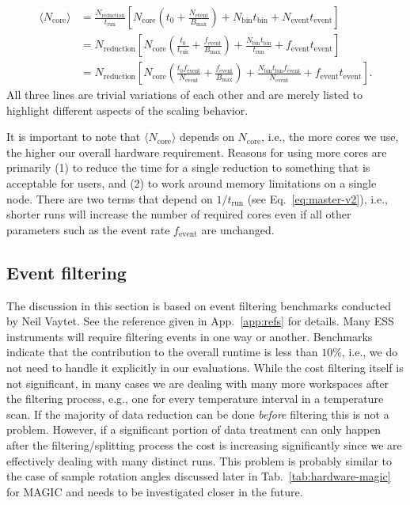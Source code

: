 \documentclass[a4paper,english,numbers=noenddot,bibliography=totoc,chapterprefix=on,DIV=12]{scrartcl}
\newcommand{\Trun}{t_{\text{run}}}
\newcommand{\Tbin}{t_{\text{bin}}}
\newcommand{\Tevent}{t_{\text{event}}}
\newcommand{\Nbin}{N_{\text{bin}}}
\newcommand{\Ncore}{N_{\text{core}}}
\newcommand{\Ncoremean}{\langle N_{\text{core}}\rangle}
\newcommand{\Nevent}{N_{\text{event}}}
\newcommand{\Nreduction}{N_{\text{reduction}}}
\newcommand{\Bmax}{B_{\text{max}}}
\newcommand{\Fevent}{f_{\text{event}}}
\newcommand{\magic}{MAGIC\xspace}
\begin{document}
\begin{align}
  \Ncoremean &= \frac{\Nreduction}{\Trun}\left[\Ncore \left(t_0 + \frac{\Nevent}{\Bmax}\right) + \Nbin\Tbin + \Nevent\Tevent\right]\\
  \label{eq:master-v2}
   &= \Nreduction\left[\Ncore \left(\frac{t_0}{\Trun} + \frac{\Fevent}{\Bmax}\right) + \frac{\Nbin\Tbin}{\Trun} + \Fevent\Tevent\right]\\
   &= \Nreduction\left[\Ncore \left(\frac{t_0\Fevent}{\Nevent} + \frac{\Fevent}{\Bmax}\right) + \frac{\Nbin\Tbin\Fevent}{\Nevent} + \Fevent\Tevent\right].
\end{align}
All three lines are trivial variations of each other and are merely listed to highlight different aspects of the scaling behavior.

It is important to note that $\Ncoremean$ depends on $\Ncore$, i.e., the more cores we use, the higher our overall hardware requirement.
Reasons for using more cores are primarily (1) to reduce the time for a single reduction to something that is acceptable for users, and (2) to work around memory limitations on a single node.
There are two terms that depend on $1/\Trun$ (see Eq.~\eqref{eq:master-v2}), i.e., shorter runs will increase the number of required cores even if all other parameters such as the event rate $\Fevent$ are unchanged.

\subsection{Event filtering}

The discussion in this section is based on event filtering benchmarks conducted by Neil Vaytet.
See the reference given in App.~\ref{app:refs} for details.
Many ESS instruments will require filtering events in one way or another.
Benchmarks indicate that the contribution to the overall runtime is less than $10\%$, i.e., we do not need to handle it explicitly in our evaluations.
While the cost filtering itself is not significant, in many cases we are dealing with many more workspaces after the filtering process, e.g., one for every temperature interval in a temperature scan.
If the majority of data reduction can be done \emph{before} filtering this is not a problem.
However, if a significant portion of data treatment can only happen after the filtering/splitting process the cost is increasing significantly since we are effectively dealing with many distinct runs.
This problem is probably similar to the case of sample rotation angles discussed later in Tab.~\ref{tab:hardware-magic} for \magic and needs to be investigated closer in the future.
\end{document}
